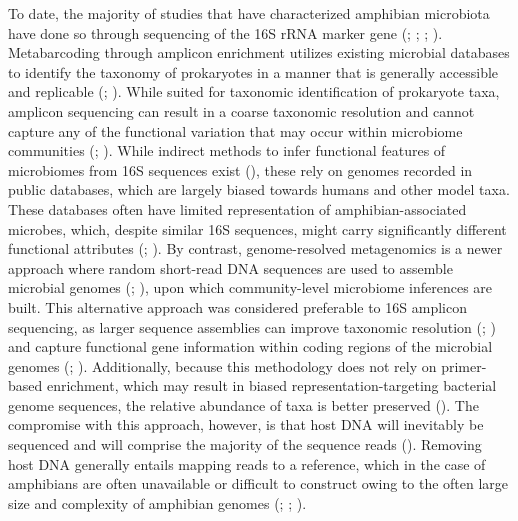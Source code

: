 \documentclass[
  12pt,
]{article}
\begin{document}
To date, the majority of studies that have characterized amphibian
microbiota have done so through sequencing of the 16S rRNA marker gene
(;
;
;
). Metabarcoding
through amplicon enrichment utilizes existing microbial databases to
identify the taxonomy of prokaryotes in a manner that is generally
accessible and replicable (; ). While
suited for taxonomic identification of prokaryote taxa, amplicon
sequencing can result in a coarse taxonomic resolution and cannot
capture any of the functional variation that may occur within microbiome
communities (; ).
While indirect methods to infer functional features of microbiomes from
16S sequences exist (), these rely on genomes recorded in public databases, which
are largely biased towards humans and other model taxa. These databases
often have limited representation of amphibian-associated microbes,
which, despite similar 16S sequences, might carry significantly
different functional attributes
(;
). By contrast,
genome-resolved metagenomics is a newer approach where random short-read
DNA sequences are used to assemble microbial genomes
(;
), upon which
community-level microbiome inferences are built. This alternative
approach was considered preferable to 16S amplicon sequencing, as larger
sequence assemblies can improve taxonomic resolution
(;
) and capture
functional gene information within coding regions of the microbial
genomes (;
).
Additionally, because this methodology does not rely on primer-based
enrichment, which may result in biased representation-targeting
bacterial genome sequences, the relative abundance of taxa is better
preserved (). The
compromise with this approach, however, is that host DNA will inevitably
be sequenced and will comprise the majority of the sequence reads
(). Removing host DNA generally entails mapping reads to a
reference, which in the case of amphibians are often unavailable or
difficult to construct owing to the often large size and complexity of
amphibian genomes (;
;
).
\end{document}
